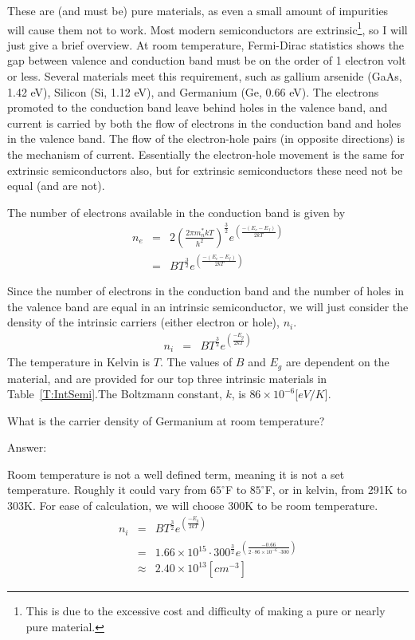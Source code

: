 These are (and must be) pure materials, as even a small amount of impurities will cause them not to work.  Most modern semiconductors are extrinsic\footnote{This is due to the excessive cost and difficulty of making a pure or nearly pure material.}, so I will just give a brief overview.  At room temperature, Fermi-Dirac statistics shows the gap between valence and conduction band must be on the order of 1 electron volt or less.  Several materials meet this requirement, such as gallium arsenide (GaAs, 1.42 eV), Silicon (Si, 1.12 eV), and Germanium (Ge, 0.66 eV).  The electrons promoted to the conduction band leave behind holes in the valence band, and current is carried by both the flow of electrons in the conduction band and holes in the valence band.  The flow of the electron-hole pairs (in opposite directions) is the mechanism of current.  Essentially the electron-hole movement is the same for extrinsic semiconductors also, but for extrinsic semiconductors these need not be equal (and are not).

The number of electrons available in the conduction band is  given by
\begin{eqnarray}
n_e &=& 2\left(\frac{2\pi m^*_nkT}{h^2}\right)^{\frac{3}{2}}e^{\left(\frac{-(E_c-E_f)}{2kT}\right)}\\
&=&BT^{\frac{3}{2}}e^{\left(\frac{-(E_c-E_f)}{2kT}\right)}
\end{eqnarray}



Since the number of electrons in the conduction band and the number of holes in the valence band are equal in an intrinsic semiconductor, we will just consider the density of the intrinsic carriers (either electron or hole), $n_i$.
\begin{eqnarray}
n_i &=& BT^{\frac{3}{2}}e^{\left(\frac{-E_g}{2kT}\right)}
\end{eqnarray}
The temperature in Kelvin is $T$.  The values of $B$ and $E_g$ are dependent on the material, and are provided for our top three intrinsic materials in Table~\ref{T:IntSemi}.The Boltzmann constant, $k$, is $86\times 10^{-6}$[$eV/K$].

\begin{example}
What is the carrier density of Germanium at room temperature?

Answer:

Room temperature is not a well defined term, meaning it is not a set temperature.  Roughly it could vary from $65^\circ$F to $85^\circ$F, or in kelvin, from 291K to 303K.  For ease of calculation, we will choose 300K to be room temperature.
\begin{eqnarray}
n_i
&=& BT^{\frac{3}{2}}e^{\left(\frac{-E_g}{2kT}\right)} \\
&=& 1.66\times 10^{15}\cdot 300^{\frac{3}{2}}e^{\left(\frac{-0.66}{2\cdot 86\times 10^{-6} \cdot 300}\right)}\\
&\approx & 2.40\times 10^{13} [cm^{-3}]
\end{eqnarray}
\end{example}


